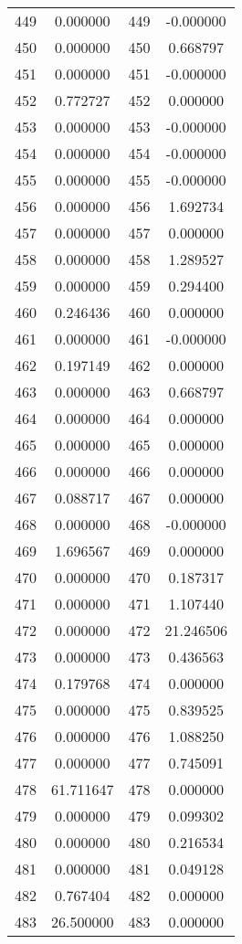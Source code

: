 \documentclass[12pt]{article}
\begin{document}
\begin{longtable}{@{}cccc@{}}
449 & 0.000000 & 449 & -0.000000 \\
450 & 0.000000 & 450 & 0.668797 \\
451 & 0.000000 & 451 & -0.000000 \\
452 & 0.772727 & 452 & 0.000000 \\
453 & 0.000000 & 453 & -0.000000 \\
454 & 0.000000 & 454 & -0.000000 \\
455 & 0.000000 & 455 & -0.000000 \\
456 & 0.000000 & 456 & 1.692734 \\
457 & 0.000000 & 457 & 0.000000 \\
458 & 0.000000 & 458 & 1.289527 \\
459 & 0.000000 & 459 & 0.294400 \\
460 & 0.246436 & 460 & 0.000000 \\
461 & 0.000000 & 461 & -0.000000 \\
462 & 0.197149 & 462 & 0.000000 \\
463 & 0.000000 & 463 & 0.668797 \\
464 & 0.000000 & 464 & 0.000000 \\
465 & 0.000000 & 465 & 0.000000 \\
466 & 0.000000 & 466 & 0.000000 \\
467 & 0.088717 & 467 & 0.000000 \\
468 & 0.000000 & 468 & -0.000000 \\
469 & 1.696567 & 469 & 0.000000 \\
470 & 0.000000 & 470 & 0.187317 \\
471 & 0.000000 & 471 & 1.107440 \\
472 & 0.000000 & 472 & 21.246506 \\
473 & 0.000000 & 473 & 0.436563 \\
474 & 0.179768 & 474 & 0.000000 \\
475 & 0.000000 & 475 & 0.839525 \\
476 & 0.000000 & 476 & 1.088250 \\
477 & 0.000000 & 477 & 0.745091 \\
478 & 61.711647 & 478 & 0.000000 \\
479 & 0.000000 & 479 & 0.099302 \\
480 & 0.000000 & 480 & 0.216534 \\
481 & 0.000000 & 481 & 0.049128 \\
482 & 0.767404 & 482 & 0.000000 \\
483 & 26.500000 & 483 & 0.000000 \\

\end{longtable}
\end{document}
